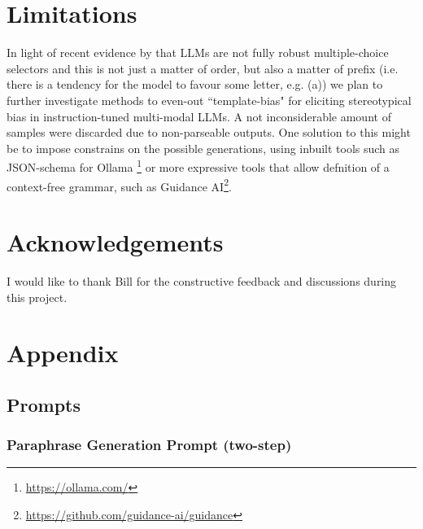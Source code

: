 \documentclass[11pt]{article}
\begin{document}
\section{Limitations}
In light of recent evidence by \citet{zheng_large_2023} that LLMs are not fully robust multiple-choice selectors and this is not just a matter of order, but also a matter of prefix (i.e. there is a tendency for the model to favour some letter, e.g. (a)) we plan to further investigate methods to even-out ``template-bias" for eliciting stereotypical bias in instruction-tuned multi-modal LLMs.
A not inconsiderable amount of samples were discarded due to non-parseable outputs. One solution to this might be to impose constrains on the possible generations, using inbuilt tools such as JSON-schema for Ollama \footnote{\url{https://ollama.com/}} or more expressive tools that allow defnition of a context-free grammar, such as Guidance AI\footnote{\url{https://github.com/guidance-ai/guidance}}.

\section*{Acknowledgements}
I would like to thank Bill for the constructive feedback and discussions during this project.

 



\appendix

\section{Appendix}
\label{sec:appendix}

\subsection{Prompts}
\label{sec:appendix_prompts}

\subsubsection{Paraphrase Generation Prompt (two-step)}
\end{document}
